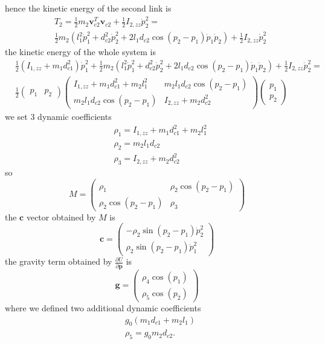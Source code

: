 \documentclass[10pt, a4paper]{report}
\begin{document}
hence the kinetic energy of the second link is\begin{align}
    &T_2=\frac{1}{2}m_2\mathbf v_{c2}^T\mathbf v_{c2}+\frac{1}{2}I_{2,zz}\dot p_2^2=\\ 
    &\frac{1}{2}m_2(l_1^2\dot p_1^2+d_{c2}^2\dot p_2^2+2l_1d_{c2}\cos(p_2-p_1)\dot p_1\dot p_2)+\frac{1}{2}I_{2,zz}\dot p_2^2
\end{align}
the kinetic energy of the whole system is\begin{align}
    &\frac{1}{2}(I_{1,zz}+m_1d_{c1}^2)\dot p_1^2+\frac{1}{2}m_2(l_1^2\dot p_1^2+d_{c2}^2\dot p_2^2+2l_1d_{c2}\cos(p_2-p_1)\dot p_1\dot p_2)+\frac{1}{2}I_{2,zz}\dot p_2^2=\\[1.5ex]
    &\frac{1}{2}\begin{pmatrix}
        p_1&p_2
    \end{pmatrix}\begin{pmatrix}
        I_{1,zz}+m_1d_{c1}^2+m_2l_1^2&m_2l_1d_{c2}\cos(p_2-p_1)\\
        m_2l_1d_{c2}\cos(p_2-p_1)&I_{2,zz}+m_2d_{c2}^2
    \end{pmatrix}\begin{pmatrix}
        p_1\\ p_2
    \end{pmatrix}
\end{align}
we set 3 dynamic coefficients\begin{align}
    &\rho_1=I_{1,zz}+m_1d_{c1}^2+m_2l_1^2\\ 
    &\rho_2=m_2l_1d_{c2}\\ 
    &\rho_3=I_{2,zz}+m_2d_{c2}^2
\end{align}
so\begin{equation}
    M=\begin{pmatrix}
        \rho_1&\rho_2\cos(p_2-p_1)\\ 
        \rho_2\cos(p_2-p_1)&\rho_3
    \end{pmatrix}
\end{equation}
the $\mathbf c$ vector obtained by $M$ is \begin{equation}
    \mathbf c=\begin{pmatrix}
        -\rho_2\sin(p_2-p_1)\dot p_2^2\\ 
        \rho_2\sin(p_2-p_1)\dot p_1^2
    \end{pmatrix}
\end{equation}
the gravity term obtained by $\frac{\partial U}{\partial \mathbf p}$ is\begin{equation}
    \mathbf g=\begin{pmatrix}
        \rho_4\cos(p_1)\\ 
        \rho_5\cos(p_2)
    \end{pmatrix}
\end{equation}
where we defined two additional dynamic coefficients\begin{align}
    &g_0(m_1d_{c1}+m_2l_1)\\
    &\rho_5=g_0m_2d_{c2}.
\end{align}
\end{document}
